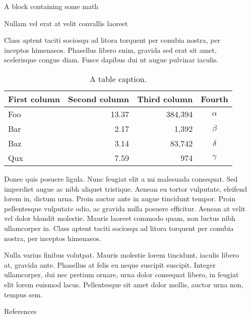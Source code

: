 \documentclass[final, xcolor={svgnames}]{beamer}
\newlength{\sepwidth}
\newlength{\colwidth}
\newcommand{\separatorcolumn}{\begin{column}{\sepwidth}\end{column}}
\begin{document}
\begin{frame}[t]
\begin{columns}[t]
\begin{column}{\colwidth}
\begin{block}{A block containing some math}
  \end{block}

  \begin{block}{Nullam vel erat at velit convallis laoreet}

    Class aptent taciti sociosqu ad litora torquent per conubia nostra, per
    inceptos himenaeos. Phasellus libero enim, gravida sed erat sit amet,
    scelerisque congue diam. Fusce dapibus dui ut augue pulvinar iaculis.

    \begin{table}
      \centering
      \begin{tabular}{l r r c}
        \toprule
        \textbf{First column} & \textbf{Second column} & \textbf{Third column} & \textbf{Fourth} \\
        \midrule
        Foo & 13.37 & 384,394 & $\alpha$ \\
        Bar & 2.17 & 1,392 & $\beta$ \\
        Baz & 3.14 & 83,742 & $\delta$ \\
        Qux & 7.59 & 974 & $\gamma$ \\
        \bottomrule
      \end{tabular}
      \caption{A table caption.}
    \end{table}

    Donec quis posuere ligula. Nunc feugiat elit a mi malesuada consequat. Sed
    imperdiet augue ac nibh aliquet tristique. Aenean eu tortor vulputate,
    eleifend lorem in, dictum urna. Proin auctor ante in augue tincidunt
    tempor. Proin pellentesque vulputate odio, ac gravida nulla posuere
    efficitur. Aenean at velit vel dolor blandit molestie. Mauris laoreet
    commodo quam, non luctus nibh ullamcorper in. Class aptent taciti sociosqu
    ad litora torquent per conubia nostra, per inceptos himenaeos.

    Nulla varius finibus volutpat. Mauris molestie lorem tincidunt, iaculis
    libero at, gravida ante. Phasellus at felis eu neque suscipit suscipit.
    Integer ullamcorper, dui nec pretium ornare, urna dolor consequat libero,
    in feugiat elit lorem euismod lacus. Pellentesque sit amet dolor mollis,
    auctor urna non, tempus sem.

  \end{block}

  \begin{block}{References}

    \nocite{*}
    \footnotesize{}

  \end{block}

\end{column}

\separatorcolumn
\end{columns}
\end{frame}
\end{document}
